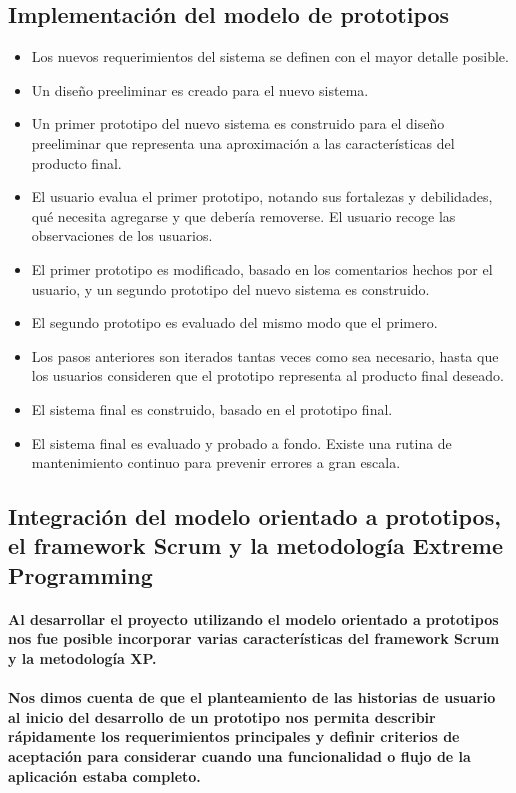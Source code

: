 \subsection{Implementación del modelo de prototipos}
\begin{itemize}
  \item Los nuevos requerimientos del sistema se definen con el mayor detalle posible.
  \item Un diseño preeliminar es creado para el nuevo sistema. 
  \item Un primer prototipo del nuevo sistema es construido para el diseño preeliminar que representa una aproximación a las características del producto final.
  \item El usuario evalua el primer prototipo, notando sus fortalezas y debilidades, qué necesita agregarse y que debería removerse. El usuario recoge las observaciones de los usuarios. 
  \item El primer prototipo es modificado, basado en los comentarios hechos por el usuario, y un segundo prototipo del nuevo sistema es construido.
  \item El segundo prototipo es evaluado del mismo modo que el primero.
  \item Los pasos anteriores son iterados tantas veces como sea necesario, hasta que los usuarios consideren que el prototipo representa al producto final deseado.
  \item El sistema final es construido, basado en el prototipo final.
  \item El sistema final es evaluado y probado a fondo. Existe una rutina de mantenimiento continuo para prevenir errores a gran escala.
\end{itemize}

\subsection{Integración del modelo orientado a prototipos, el framework Scrum y la metodología Extreme Programming}


\paragraph{Al desarrollar el proyecto utilizando el modelo orientado a prototipos nos fue posible incorporar varias características del framework Scrum y la metodología XP.}

\paragraph{Nos dimos cuenta de que el planteamiento de las historias de usuario al inicio del desarrollo de un prototipo nos permita describir rápidamente los requerimientos principales y definir criterios de aceptación para considerar cuando una funcionalidad o flujo de la aplicación estaba completo.}


